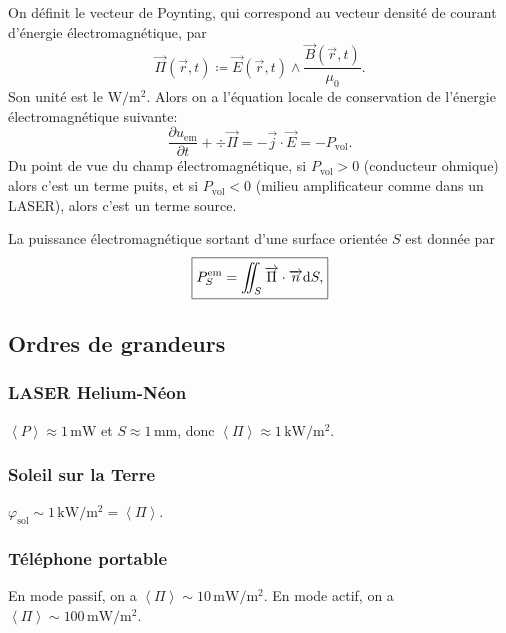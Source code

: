 On définit le vecteur de Poynting, qui correspond au vecteur densité de courant d'énergie électromagnétique, par
\begin{equation*}
    \boxed{
        \vec{\Pi}(\vec{r},t)\coloneqq\vec{E}(\vec{r},t)\wedge\frac{\vec{B}(\vec{r},t)}{\mu_0}.
    }
\end{equation*}
Son unité est le $\si{\watt\per\metre\squared}$. Alors on a l'équation locale de conservation de l'énergie électromagnétique suivante:
\begin{equation*}
    \boxed{
        \frac{\partial u_{\mathrm{em}}}{\partial t}+\div\vec{\Pi}=-\vec{j}\cdot\vec{E}=-P_{\mathrm{vol}}.
    }
\end{equation*}
Du point de vue du champ électromagnétique, si $P_{\mathrm{vol}}>0$ (conducteur ohmique) alors c'est un terme \og puits\fg, et si $P_{\mathrm{vol}}<0$ (milieu amplificateur comme dans un LASER), alors c'est un terme \og source\fg.

La puissance électromagnétique sortant d'une surface orientée $S$ est donnée par
\begin{equation*}
    \boxed{
        P_{S}^{\mathrm{em}}=\iint_{S}\protect\overrightarrow{{\Pi}}\cdot\protect\overrightarrow{{n}}\mathrm{d} S,
    }
\end{equation*}

\subsection{Ordres de grandeurs}
\subsubsection{LASER Helium-Néon}
$\left\langle P\right\rangle\approx1\,\si{\milli\watt}$ et $S\approx1\,\si{\milli\metre}$, donc $\left\langle\Pi\right\rangle\approx1\,\si{\kilo\watt\per\metre\squared}$.

\subsubsection{Soleil sur la Terre}
$\varphi_{\mathrm{sol}}\sim1\,\si{\kilo\watt\per\metre\squared}=\left\langle\Pi\right\rangle$.

\subsubsection{Téléphone portable}
En mode \og passif\fg, on a $\left\langle\Pi\right\rangle\sim10\,\si{\milli\watt\per\metre\squared}$. En mode \og actif\fg, on a $\left\langle\Pi\right\rangle\sim100\,\si{\milli\watt\per\metre\squared}$.


